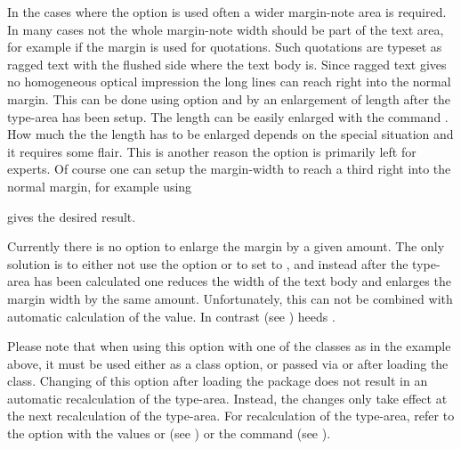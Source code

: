 \begin{Explain}
  In the cases where the option  is used often a
  wider margin-note area is required.  In many cases not the whole
  margin-note width should be part of the text area, for example if
  the margin is used for quotations.  Such quotations are typeset as
  ragged text with the flushed side where the text body is.  Since
  ragged text gives no homogeneous optical impression the long lines
  can reach right into the normal margin.  This can be done using
  option  and by an enlargement of length
   after the type-area has been setup.  The
  length can be easily enlarged with the command .
  How much the the length has to be enlarged depends on the special
  situation and it requires some flair.  This is another reason the
   option is primarily left for experts.  Of course
  one can setup the margin-width to reach a third right into the
  normal margin, for example using
\begin{lstcode}[belowskip=\dp\strutbox]
  \setlength{\marginparwidth}{1.5\marginparwidth}
\end{lstcode}
  gives the desired result.

  Currently there is no option to enlarge the margin by a given
  amount.  The only solution is to either not use the option
   or to set  to ,
  and instead after the type-area has been calculated one reduces the
  width of the text body  and enlarges the margin
  width  by the same amount.  Unfortunately,
  this can not be combined with automatic calculation of the
   value.  In contrast
   (see
  ) heeds
  .
\end{Explain}

Please note that when using this option with one of the {\KOMAScript}
classes as in the example above, it must be used either as a class
option, or passed via  or  after
loading the class. Changing of this option after loading the
 package does not result in an automatic
recalculation of the type-area. Instead, the changes only take effect
at the next recalculation of the type-area. For recalculation of the
type-area, refer to the  option with the values
 or  (see
) or the
 command (see
).%
%
%


